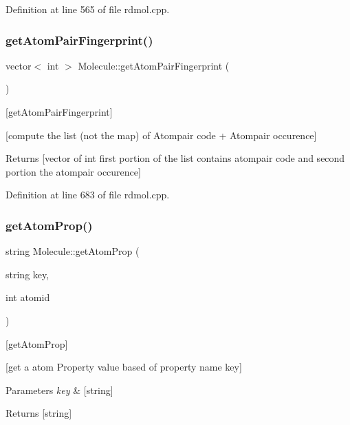 Definition at line 565 of file rdmol.\+cpp.

\mbox{\label{class_molecule_abfb8fda0aff9f7d749257badadd5d6d5}} 
\subsubsection{\texorpdfstring{get\+Atom\+Pair\+Fingerprint()}{getAtomPairFingerprint()}}
{\footnotesize\ttfamily vector$<$ int $>$ Molecule\+::get\+Atom\+Pair\+Fingerprint (\begin{DoxyParamCaption}{ }\end{DoxyParamCaption})}



\mbox{[}get\+Atom\+Pair\+Fingerprint\mbox{]} 

\mbox{[}compute the list (not the map) of Atompair code + Atompair occurence\mbox{]} \begin{DoxyReturn}{Returns}
\mbox{[}vector of int first portion of the list contains atompair code and second portion the atompair occurence\mbox{]} 
\end{DoxyReturn}


Definition at line 683 of file rdmol.\+cpp.

\mbox{\label{class_molecule_acb057213561817b5e78a1e5e5845ae8f}} 
\subsubsection{\texorpdfstring{get\+Atom\+Prop()}{getAtomProp()}}
{\footnotesize\ttfamily string Molecule\+::get\+Atom\+Prop (\begin{DoxyParamCaption}\item[{string}]{key,  }\item[{int}]{atomid }\end{DoxyParamCaption})}



\mbox{[}get\+Atom\+Prop\mbox{]} 

\mbox{[}get a atom Property value based of property name key\mbox{]}


\begin{DoxyParams}{Parameters}
{\em key} & \mbox{[}string\mbox{]} \\
\hline
\end{DoxyParams}
\begin{DoxyReturn}{Returns}
\mbox{[}string\mbox{]} 
\end{DoxyReturn}


